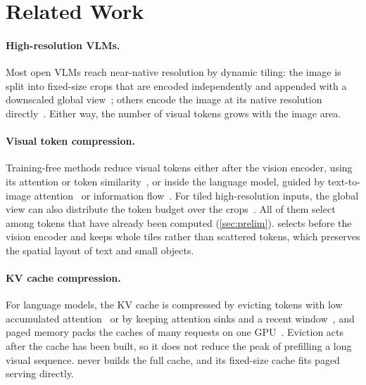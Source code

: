\section{Related Work}
\label{sec:related}

\paragraph{High-resolution VLMs.}
Most open VLMs reach near-native resolution by dynamic tiling: the image is split into fixed-size crops
that are encoded independently and appended with a downscaled global
view~\cite{monkey,llavauhd,llavanext,internvl15,llavaov,internvl35}; others encode the image at its native
resolution directly~\cite{qwen2vl}. Either way, the number of visual tokens grows with the image area.

\paragraph{Visual token compression.}
Training-free methods reduce visual tokens either after the vision encoder, using its attention or
token similarity~\cite{tome,prumerge,visionzip}, or inside the language model, guided by text-to-image
attention~\cite{fastv,pdrop,sparsevlm} or information flow~\cite{ifprune}. For tiled high-resolution
inputs, the global view can also distribute the token budget over the crops~\cite{hired,globalcom2}. All of them select among tokens that have already been computed (\cref{sec:prelim}). \method
selects before the vision encoder and keeps whole tiles rather than scattered tokens, which preserves the
spatial layout of text and small objects.

\paragraph{KV cache compression.}
For language models, the KV cache is compressed by evicting tokens with low accumulated
attention~\cite{h2o} or by keeping attention sinks and a recent window~\cite{streamingllm}, and paged
memory packs the caches of many requests on one GPU~\cite{pagedattention}. Eviction acts after the cache
has been built, so it does not reduce the peak of prefilling a long visual sequence. \method never builds
the full cache, and its fixed-size cache fits paged serving directly.

